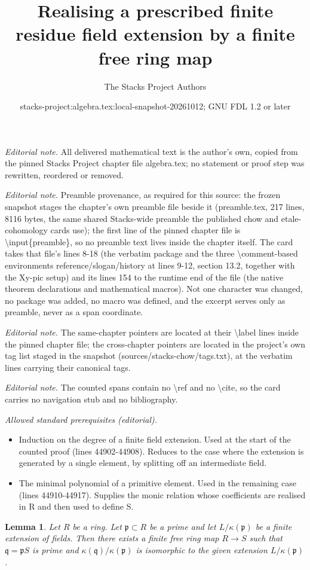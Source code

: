 \documentclass[10pt,a4paper]{amsart}
\title{Realising a prescribed finite residue field extension by a finite free ring map}
\author{The Stacks Project Authors}
\date{stacks-project:algebra.tex:local-snapshot-20261012; GNU FDL 1.2 or later}
\theoremstyle{plain}
\newtheorem{lemma}[subsection]{Lemma}
\theoremstyle{definition}
\theoremstyle{remark}
\numberwithin{equation}{subsection}
\begin{document}
\maketitle
\noindent\textit{Editorial note.} All delivered mathematical text is the author's own, copied from the pinned Stacks Project chapter file algebra.tex; no statement or proof step was rewritten, reordered or removed.\par\medskip
\noindent\textit{Editorial note.} Preamble provenance, as required for this source: the frozen snapshot stages the chapter's own preamble file beside it (preamble.tex, 217 lines, 8116 bytes, the same shared Stacks-wide preamble the published chow and etale-cohomology cards use); the first line of the pinned chapter file is \textbackslash{}input\{preamble\}, so no preamble text lives inside the chapter itself. The card takes that file's lines 8-18 (the verbatim package and the three \textbackslash{}comment-based environments reference/slogan/history at lines 9-12, section 13.2, together with the Xy-pic setup) and its lines 154 to the runtime end of the file (the native theorem declarations and mathematical macros). Not one character was changed, no package was added, no macro was defined, and the excerpt serves only as preamble, never as a span coordinate.\par\medskip
\noindent\textit{Editorial note.} The same-chapter pointers are located at their \textbackslash{}label lines inside the pinned chapter file; the cross-chapter pointers are located in the project's own tag list staged in the snapshot (sources/stacks-chow/tags.txt), at the verbatim lines carrying their canonical tags.\par\medskip
\noindent\textit{Editorial note.} The counted spans contain no \textbackslash{}ref and no \textbackslash{}cite, so the card carries no navigation stub and no bibliography.\par\medskip
\noindent\textit{Allowed standard prerequisites (editorial).}\begin{itemize}
\item Induction on the degree of a finite field extension. Used at the start of the counted proof (lines 44902-44908). Reduces to the case where the extension is generated by a single element, by splitting off an intermediate field.
\item The minimal polynomial of a primitive element. Used in the remaining case (lines 44910-44917). Supplies the monic relation whose coefficients are realised in R and then used to define S.
\end{itemize}\medskip
\begin{lemma}
\label{lemma-finite-free-given-residue-field-extension}
Let $R$ be a ring. Let $\mathfrak p \subset R$ be a prime and
let $L/\kappa(\mathfrak p)$ be a finite extension of fields.
Then there exists a finite free ring map $R \to S$ such that
$\mathfrak q = \mathfrak pS$ is prime and
$\kappa(\mathfrak q)/\kappa(\mathfrak p)$ is isomorphic to the given
extension $L/\kappa(\mathfrak p)$.
\end{lemma}
\end{document}
